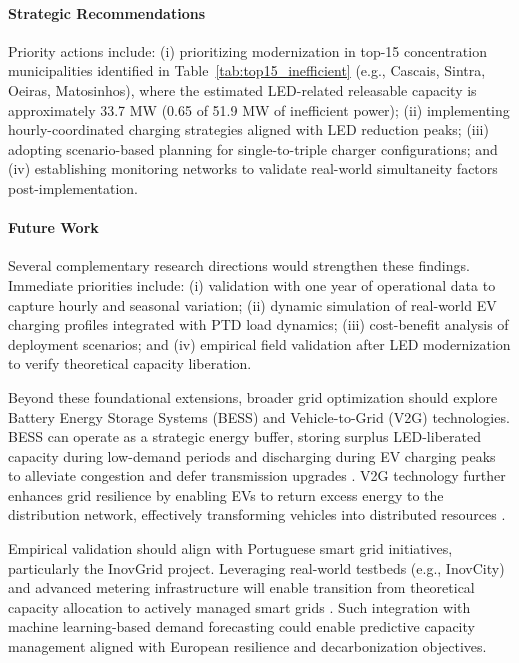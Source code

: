 \documentclass[conference]{IEEEtran}
\begin{document}
\paragraph{Strategic Recommendations}
Priority actions include: (i) prioritizing modernization in top-15 concentration municipalities identified in Table~\ref{tab:top15_inefficient} (e.g., Cascais, Sintra, Oeiras, Matosinhos), where the estimated LED-related releasable capacity is approximately 33.7 MW (0.65 of 51.9 MW of inefficient power); (ii) implementing hourly-coordinated charging strategies aligned with LED reduction peaks; (iii) adopting scenario-based planning for single-to-triple charger configurations; and (iv) establishing monitoring networks to validate real-world simultaneity factors post-implementation.

\paragraph{Future Work}

Several complementary research directions would strengthen these findings. Immediate priorities include: (i) validation with one year of operational data to capture hourly and seasonal variation; (ii) dynamic simulation of real-world EV charging profiles integrated with PTD load dynamics; (iii) cost-benefit analysis of deployment scenarios; and (iv) empirical field validation after LED modernization to verify theoretical capacity liberation.

Beyond these foundational extensions, broader grid optimization should explore Battery Energy Storage Systems (BESS) and Vehicle-to-Grid (V2G) technologies. BESS can operate as a strategic energy buffer, storing surplus LED-liberated capacity during low-demand periods and discharging during EV charging peaks to alleviate congestion and defer transmission upgrades \cite{Saldarini2024,Martins2024}. V2G technology further enhances grid resilience by enabling EVs to return excess energy to the distribution network, effectively transforming vehicles into distributed resources \cite{Saldarini2024}.

Empirical validation should align with Portuguese smart grid initiatives, particularly the InovGrid project. Leveraging real-world testbeds (e.g., InovCity) and advanced metering infrastructure will enable transition from theoretical capacity allocation to actively managed smart grids \cite{Gouveia2015,Crispim2014}. Such integration with machine learning-based demand forecasting could enable predictive capacity management aligned with European resilience and decarbonization objectives.
\end{document}

